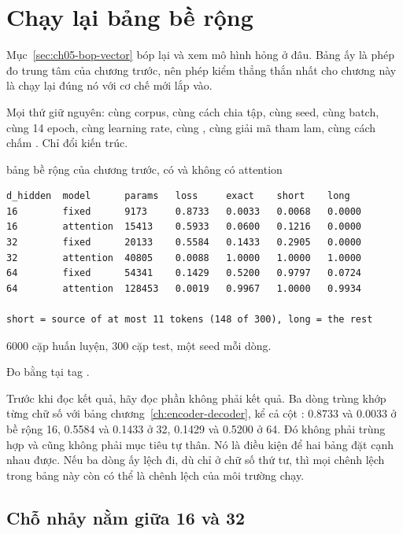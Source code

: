 \section{Chạy lại bảng bề rộng}
\label{sec:ch06-be-rong}

%
Mục~\ref{sec:ch05-bop-vector} bóp  lại và
xem mô hình hỏng ở đâu. Bảng ấy là phép đo trung tâm của chương trước, nên phép
kiểm thẳng thắn nhất cho chương này là chạy lại đúng nó với cơ chế mới lắp vào.

Mọi thứ giữ nguyên: cùng corpus, cùng cách chia tập, cùng seed, cùng batch,
cùng 14 epoch, cùng learning rate, cùng ,
cùng giải mã tham lam, cùng cách chấm . Chỉ
đổi kiến trúc.

\begin{measured}{bảng bề rộng của chương trước, có và không có attention}
\begin{verbatim}
d_hidden  model      params   loss     exact    short    long
16        fixed      9173     0.8733   0.0033   0.0068   0.0000
16        attention  15413    0.5933   0.0600   0.1216   0.0000
32        fixed      20133    0.5584   0.1433   0.2905   0.0000
32        attention  40805    0.0088   1.0000   1.0000   1.0000
64        fixed      54341    0.1429   0.5200   0.9797   0.0724
64        attention  128453   0.0019   0.9967   1.0000   0.9934

short = source of at most 11 tokens (148 of 300), long = the rest
\end{verbatim}

6000 cặp huấn luyện, 300 cặp test, một seed mỗi dòng.

Đo bằng  tại tag .
\end{measured}

%
Trước khi đọc kết quả, hãy đọc phần không phải kết quả. Ba dòng 
trùng khớp từng chữ số với bảng chương~\ref{ch:encoder-decoder}, kể cả cột
: 0.8733 và 0.0033 ở bề rộng 16, 0.5584 và 0.1433 ở 32, 0.1429 và
0.5200 ở 64. Đó không phải trùng hợp và cũng không phải mục tiêu tự thân. Nó là
điều kiện để hai bảng đặt cạnh nhau được. Nếu ba dòng ấy lệch đi, dù chỉ ở chữ
số thứ tư, thì mọi chênh lệch trong bảng này còn có thể là chênh lệch của môi
trường chạy.

\subsection*{Chỗ nhảy nằm giữa 16 và 32}

